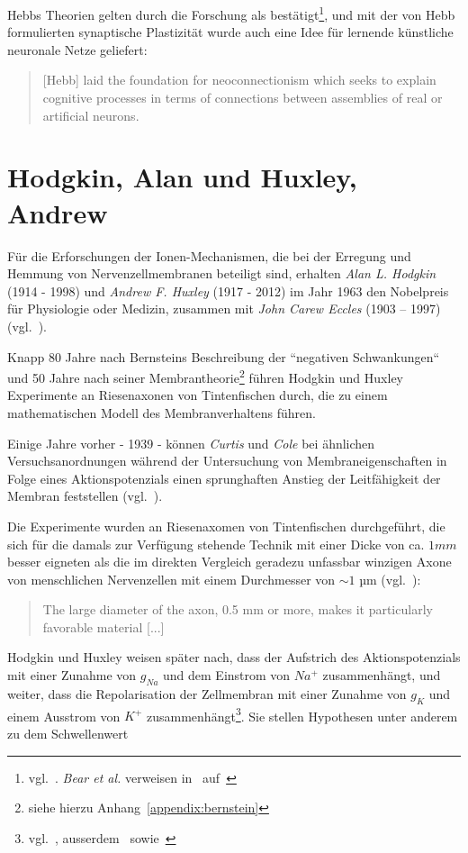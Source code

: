 Hebbs Theorien gelten durch die Forschung als bestätigt\footnote{
vgl.~\cite[833]{Flo19}. \textit{Bear et al.} verweisen in~\cite[875, Exkurs 23.5]{BCP18} auf~\cite{CL78}
}, und mit der von Hebb formulierten synaptische Plastizität wurde auch eine Idee für lernende künstliche neuronale Netze geliefert:

\blockquote[{\cite[2]{Kle99}}]{
    [Hebb] laid the foundation for neoconnectionism which seeks to explain cognitive processes in terms of connections between assemblies of real or artificial neurons.
}



\section{Hodgkin, Alan und Huxley, Andrew}\label{appendix:hodgkinhuxley}

Für die Erforschungen der Ionen-Mechanismen, die bei der Erregung und Hemmung von Nervenzellmembranen beteiligt sind, erhalten \textit{Alan L. Hodgkin} (1914 - 1998) und \textit{Andrew F. Huxley} (1917 - 2012) im Jahr 1963 den Nobelpreis für Physiologie oder Medizin, zusammen mit \textit{John Carew Eccles} (1903 – 1997) (vgl.~\cite{Gle09}).

Knapp 80 Jahre nach Bernsteins Beschreibung der ``negativen Schwankungen`` und 50 Jahre nach seiner Membrantheorie\footnote{
siehe hierzu Anhang~\ref{appendix:bernstein}
} führen Hodgkin und Huxley Experimente an Riesenaxonen von Tintenfischen durch, die zu einem mathematischen Modell des Membranverhaltens führen.

Einige Jahre vorher - 1939 - können \textit{Curtis} und \textit{Cole} bei ähnlichen Versuchsanordnungen während der Untersuchung von Membraneigenschaften in Folge eines Aktionspotenzials einen sprunghaften Anstieg der Leitfähigkeit der Membran feststellen (vgl.~\cite[669]{CC39}).

Die Experimente wurden an Riesenaxomen von Tintenfischen durchgeführt, die sich für die damals zur Verfügung stehende Technik mit einer Dicke von ca. $1 mm$ besser eigneten als die im direkten Vergleich geradezu unfassbar winzigen Axone von menschlichen Nervenzellen mit einem Durchmesser von $\sim1$ µm (vgl.~\cite[79]{Jon19}):

\blockquote[{\cite[650]{CC39}}]{
    The large diameter of the axon, 0.5 mm or more, makes it particularly favorable material {[...]}
}

Hodgkin und Huxley weisen später nach, dass der Aufstrich des Aktionspotenzials mit einer Zunahme von $g_{Na}$ und dem Einstrom von $Na^+$ zusammenhängt, und weiter, dass die Repolarisation der Zellmembran mit einer Zunahme von $g_K$ und einem Ausstrom von $K^+$ zusammenhängt\footnote{
    vgl.~\cite[75]{Jon19}, ausserdem~\cite[96]{BCP18} sowie~\cite[530 Fig. 17]{HH52}
}.
Sie stellen Hypothesen unter anderem zu dem Schwellenwert

